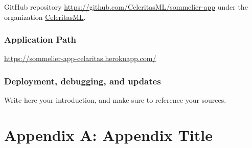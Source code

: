 \documentclass[
	a4paper,
	fontsize=10pt, %
	twoside=false, %
	secnumdepth=2, %
]{kaohandt}
\begin{document}
GitHub repository \href{https://github.com/CeleritasML/sommelier-app}{https://github.com/CeleritasML/sommelier-app} under the organization \href{https://github.com/CeleritasML}{CeleritasML}.

\subsubsection*{Application Path}

\href{https://sommelier-app-celaritas.herokuapp.com/}{https://sommelier-app-celaritas.herokuapp.com/}

\subsubsection*{Deployment, debugging, and updates}

Write here your introduction, and make sure to
reference your sources.

\blindtext\sidenote[][]{\blindtext}

\appendix %

\section{Appendix A: Appendix Title}

\blindtext



\end{document}
